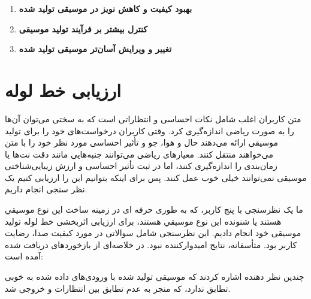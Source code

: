 \begin{enumerate}
      \def\labelenumi{\arabic{enumi}.}
      \item
            \textbf{بهبود کیفیت و کاهش نویز در موسیقی تولید شده}
      \item
            \textbf{کنترل بیشتر بر فرآیند تولید موسیقی}
      \item
            \textbf{تغییر و ویرایش آسان‌تر موسیقی تولید شده}
\end{enumerate}

\section{ارزیابی خط لوله}
متن کاربران اغلب شامل نکات احساسی و انتظاراتی است که به سختی می‌توان آن‌ها را به صورت ریاضی اندازه‌گیری کرد. وقتی کاربران درخواست‌های خود را برای تولید موسیقی ارائه می‌دهند حال و هوا، جو و تأثیر احساسی مورد نظر خود را با متن می‌خواهند منتقل کنند. معیارهای ریاضی می‌توانند جنبه‌هایی مانند دقت نت‌ها یا زمان‌بندی را اندازه‌گیری کنند، اما در ثبت تأثیر احساسی و ارزش زیبایی‌شناختی موسیقی نمی‌توانند خیلی خوب عمل کنند. پس برای اینکه بتوانیم این  را ارزیابی کنیم یک  نظر سنجی انجام داریم.

ما یک نظرسنجی با پنج کاربر، که به طوری حرفه ای در زمینه ساخت این نوع موسیقي هستند یا شنونده این نوع موسیقي هستند، برای ارزیابی اثربخشی
خط لوله تولید موسیقی خود انجام دادیم. این نظرسنجی شامل سوالاتی در مورد
کیفیت صدا، رضایت کاربر بود. متأسفانه، نتایج امیدوارکننده
نبود. در  خلاصه‌ای از بازخوردهای دریافت شده آمده است:

\begin{table}
      \centering
      \caption{نتایج نظرسنجی ارزیابی خط لوله}
      \label{tb:result}
\end{table}
چندین نظر دهنده اشاره کردند که موسیقی تولید شده با ورودی‌های داده شده به خوبی
تطابق ندارد، که منجر به عدم تطابق بین انتظارات و خروجی شد.

